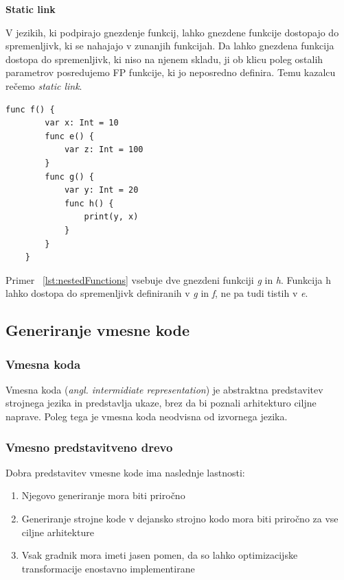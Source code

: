 \documentclass[a4paper, 12pt]{book}
\begin{document}
\textbf{Static link}

V jezikih, ki podpirajo gnezdenje funkcij, lahko gnezdene funkcije dostopajo do spremenljivk, ki se nahajajo v zunanjih funkcijah. Da lahko gnezdena funkcija dostopa do spremenljivk, ki niso na njenem skladu, ji ob klicu poleg ostalih parametrov posredujemo FP funkcije, ki jo neposredno definira. Temu kazalcu rečemo \textit{static link}. 

\begin{lstlisting}[caption={Primer gnezdenih funkcij}, captionpos=b, label={lst:nestedFunctions}]
    func f() {
        var x: Int = 10
        func e() {
            var z: Int = 100
        }
        func g() {
            var y: Int = 20
            func h() {
                print(y, x)
            }
        }
    }
\end{lstlisting}

Primer ~\ref{lst:nestedFunctions} vsebuje dve gnezdeni funkciji \textit{g} in \textit{h}. Funkcija h lahko dostopa do spremenljivk definiranih v \textit{g} in \textit{f}, ne pa tudi tistih v \textit{e}.

\subsection{Generiranje vmesne kode}   

\subsubsection{Vmesna koda}

Vmesna koda (\textit{angl. intermidiate representation}) je abstraktna predstavitev strojnega jezika in predstavlja ukaze, brez da bi poznali arhitekturo ciljne naprave. Poleg tega je vmesna koda neodvisna od izvornega jezika. \cite{modernCompiler} \\

\subsubsection{Vmesno predstavitveno drevo}

\indent Dobra predstavitev vmesne kode ima naslednje lastnosti:

\begin{enumerate}
	\item Njegovo generiranje mora biti priročno
	\item Generiranje strojne kode v dejansko strojno kodo mora biti priročno za vse ciljne arhitekture
	\item Vsak gradnik mora imeti jasen pomen, da so lahko optimizacijske transformacije enostavno implementirane
\end{enumerate}
\cite{modernCompiler}
\end{document}
